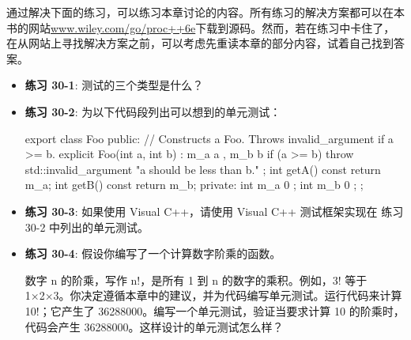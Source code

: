 通过解决下面的练习，可以练习本章讨论的内容。所有练习的解决方案都可以在本书的网站\url{www.wiley.com/go/proc++6e}下载到源码。然而，若在练习中卡住了，在从网站上寻找解决方案之前，可以考虑先重读本章的部分内容，试着自己找到答案。

\begin{itemize}
\item
\textbf{练习 30-1}: 测试的三个类型是什么？

\item
\textbf{练习 30-2}: 为以下代码段列出可以想到的单元测试：

\begin{cpp}
export class Foo
{
    public:
        // Constructs a Foo. Throws invalid_argument if a >= b.
        explicit Foo(int a, int b) : m_a { a }, m_b { b }
        {
            if (a >= b) {
                throw std::invalid_argument { "a should be less than b." };
            }
        }
        int getA() const { return m_a; }
        int getB() const { return m_b; }
    private:
        int m_a { 0 };
        int m_b { 0 };
};
\end{cpp}

\item
\textbf{练习 30-3}: 如果使用 Visual C++，请使用 Visual C++ 测试框架实现在 练习 30-2 中列出的单元测试。

\item
\textbf{练习 30-4}: 假设你编写了一个计算数字阶乘的函数。

数字 n 的阶乘，写作 n!，是所有 1 到 n 的数字的乘积。例如，3! 等于 1×2×3。你决定遵循本章中的建议，并为代码编写单元测试。运行代码来计算 10!；它产生了 36288000。编写一个单元测试，验证当要求计算 10 的阶乘时，代码会产生 36288000。这样设计的单元测试怎么样？
\end{itemize}
